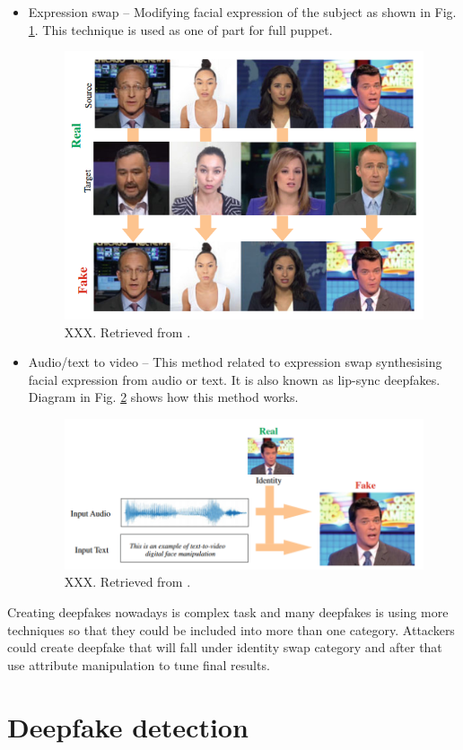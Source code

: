 \begin{itemize}
\item Expression swap – Modifying facial expression of the subject as shown in Fig. \ref{fig:expression_swap}. This technique is used as one of part for full puppet.
\begin{figure}[H]
    \centering
    \includegraphics[width=.64\linewidth]{other-fig/expression_swap.png}        
    \caption{XXX. Retrieved from \cite{IntroductionToDigitalFaceManipulation}.}
\label{fig:expression_swap}
\end{figure}

\item Audio/text to video – This method related to expression swap synthesising facial expression from audio or text. It is also known as lip-sync deepfakes. Diagram in Fig. \ref{fig:audio_to_video} shows how this method works.
\begin{figure}[H]
    \centering
    \includegraphics[width=.65\linewidth]{other-fig/audio_to_video.png}        
    \caption{XXX. Retrieved from \cite{IntroductionToDigitalFaceManipulation}.}
\label{fig:audio_to_video}
\end{figure}
\end{itemize}

Creating deepfakes nowadays is complex task and many deepfakes is using more techniques so that they could be included into more than one category. Attackers could create deepfake that will fall under identity swap category and after that use attribute manipulation to tune final results.

\chapter{Deepfake detection}
\label{chapter:deepfake_detectoin}

